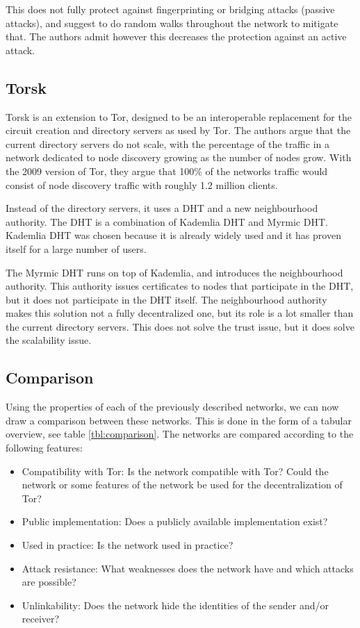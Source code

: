 \documentclass[12pt,journal,compsoc]{IEEEtran}
\begin{document}
		This does not fully protect against fingerprinting or bridging attacks (passive attacks), and suggest to do random walks throughout the network to mitigate that. The authors admit however this decreases the protection against an active attack.
		
	\subsection{Torsk} Torsk \cite{mclachlan2009scalable} is an extension to Tor, designed to be an interoperable replacement for the circuit creation and directory servers as used by Tor. The authors argue that the current directory servers do not scale, with the percentage of the traffic in a network dedicated to node discovery growing as the number of nodes grow. With the 2009 version of Tor, they argue that 100\% of the networks traffic would consist of node discovery traffic with roughly 1.2 million clients. 
		
		Instead of the directory servers, it uses a DHT and a new neighbourhood authority. The DHT is a combination of Kademlia DHT and Myrmic DHT. Kademlia DHT was chosen because it is already widely used and it has proven itself for a large number of users.
		
		The Myrmic DHT runs on top of Kademlia, and introduces the neighbourhood authority. This authority issues certificates to nodes that participate in the DHT, but it does not participate in the DHT itself. The neighbourhood authority makes this solution not a fully decentralized one, but its role is a lot smaller than the current directory servers. This does not solve the trust issue, but it does solve the scalability issue.

	\subsection{Comparison}
		Using the properties of each of the previously described networks, we can now draw a comparison between these networks. This is done in the form of a tabular overview, see table \ref{tbl:comparison}. The networks are compared according to the following features:
	
		\begin{itemize}
			\item{Compatibility with Tor:} Is the network compatible with Tor? Could the network or some features of the network be used for the decentralization of Tor?
			\item{Public implementation:} Does a publicly available implementation exist?
			\item{Used in practice:} Is the network used in practice?
			\item{Attack resistance:} What weaknesses does the network have and which attacks are possible?
			\item{Unlinkability:} Does the network hide the identities of the sender and/or receiver?
		\end{itemize}
		
\end{document}
